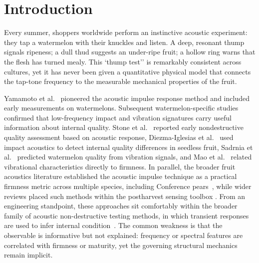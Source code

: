 \section{Introduction}
\label{sec:introduction}


Every summer, shoppers worldwide perform an instinctive acoustic
experiment: they tap a watermelon with their knuckles and listen.  A
deep, resonant thump signals ripeness; a dull thud suggests an
under-ripe fruit; a hollow ring warns that the flesh has turned mealy.
This `thump test'' is remarkably consistent across cultures, yet it has
never been given a quantitative physical model that connects the tap-tone
frequency to the measurable mechanical properties of the fruit.


Yamamoto et al.~\cite{Yamamoto1980} pioneered the acoustic impulse
response method and included early measurements on watermelons.
Subsequent watermelon-specific studies confirmed that low-frequency
impact and vibration signatures carry useful information about internal
quality.  Stone et al.~\cite{Stone1996} reported early nondestructive
quality assessment based on acoustic response, Diezma-Iglesias et
al.~\cite{DiezmaIglesias2004} used impact acoustics to detect internal
quality differences in seedless fruit, Sadrnia et
al.~\cite{Sadrnia2008Vibration} predicted watermelon quality from
vibration signals, and Mao et al.~\cite{Mao2016} related vibrational
characteristics directly to firmness.  In parallel, the broader fruit
acoustics literature established the acoustic impulse technique as a
practical firmness metric across multiple species, including Conference
pears~\cite{Schotte1999, DeBelieetal2000, Zude2006}, while wider reviews
placed such methods within the postharvest sensing toolbox
\cite{Abbott1997}.  From an engineering standpoint, these approaches sit
comfortably within the broader family of acoustic non-destructive
testing methods, in which transient responses are used to infer internal
condition~\cite{GrosseOhtsu2008}.  The common weakness is that the
observable is informative but not explained: frequency or spectral
features are correlated with firmness or maturity, yet the governing
structural mechanics remain implicit.



